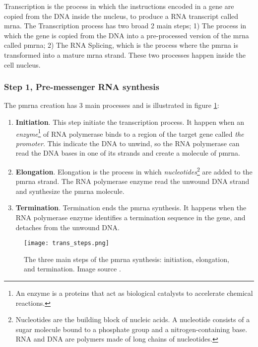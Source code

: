 
\glsresetall
\graphicspath{{./Sections/Basics/Resources/}}

Transcription is the process in which the instructions encoded in a gene are copied from the DNA inside the nucleus, to produce a RNA transcript called \acrlong{mrna}. The Transcription process has two broad 2 main steps; 1) The process in which the gene is copied from the DNA into a pre-processed version of the \gls{mrna} called \gls{pmrna}; 2) The RNA Splicing, which is the process where the \gls{pmrna} is transformed into a mature \gls{mrna} strand. These two processes happen inside the cell nucleus.

\subsubsection{Step 1, Pre-messenger RNA synthesis}
The \gls{pmrna} creation has 3 main processes\cite{MolecularWatson} and is illustrated in figure \ref{fig:BB:premrna_synth}:

\begin{enumerate}
  \item \textbf{Initiation}. This step initiate the transcription process. It happen when an \textit{enzyme}\footnote{An enzyme is a proteins that act as biological catalysts to accelerate chemical reactions.} of RNA polymerase binds to a region of the target gene called \textit{the promoter}. This indicate the DNA to unwind, so the RNA polymerase can read the DNA bases in one of its strands and create a molecule of \gls{pmrna}.
  \item \textbf{Elongation}. Elongation is the process in which \textit{nucleotides}\footnote{Nucleotides are the building block of nucleic acids. A nucleotide consists of a sugar molecule bound to a phosphate group and a nitrogen-containing base. RNA and DNA are polymers made of long chains of nucleotides.} are added to the \gls{pmrna} strand. The RNA polymerase enzyme read the unwound DNA strand and synthesize the \gls{pmrna} molecule.
  \item \textbf{Termination}. Termination ends the \gls{pmrna} synthesis. It happens when the RNA polymerase enzyme identifies a termination sequence in the gene, and detaches from the unwound DNA.
\end{enumerate}

\begin{figure}[htb]
  \centering
  \texttt{[image: trans\_steps.png]}
  \caption{The three main steps of the \gls{pmrna} synthesis: initiation, elongation, and termination. Image source \cite{transcription_steps}.}
  \label{fig:BB:premrna_synth}
\end{figure}

